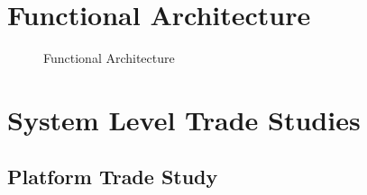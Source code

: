 \documentclass{article}
\begin{document}
\section{Functional Architecture}
\begin{figure}[H]
\centering
\def\svgwidth{\columnwidth}

\caption{Functional Architecture}
\label{fig:functional}
\end{figure}


\section{System Level Trade Studies}
	\subsection{Platform Trade Study}
	
\end{document}
